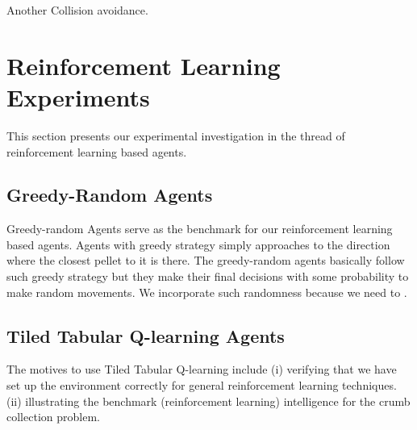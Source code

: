 \documentclass[conference]{IEEEtran}
\begin{document}
Another Collision avoidance. 

%
%
%

\section{Reinforcement Learning Experiments}
\label{section:rlexpo} 

This section presents our experimental investigation in the thread of reinforcement
learning based agents.

\subsection{Greedy-Random Agents} 
Greedy-random Agents serve as the benchmark for our reinforcement
learning based agents.
Agents with greedy strategy simply approaches to the direction where the
closest pellet to it is there.
The greedy-random agents basically follow such greedy strategy but they make
their final decisions with some probability to make random movements. 
We incorporate such randomness because we need to .

\subsection{Tiled Tabular Q-learning Agents}
The motives to use Tiled Tabular Q-learning include
(i) verifying that we have set up the environment correctly for general
reinforcement learning techniques. 
(ii) illustrating the benchmark (reinforcement learning) intelligence for the
crumb collection problem.
\end{document}
